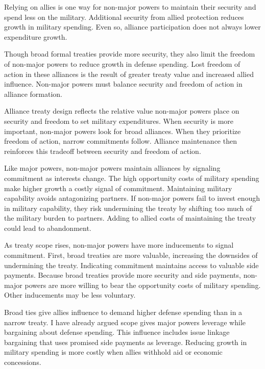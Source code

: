 \documentclass[12pt]{article}
\begin{document}
Relying on allies is one way for non-major powers to maintain their security and spend less on the military.  
Additional security from allied protection reduces growth in military spending. 
Even so, alliance participation does not always lower expenditure growth.


Though broad formal treaties provide more security, they also limit the freedom of non-major powers to reduce growth in defense spending.
Lost freedom of action in these alliances is the result of greater treaty value and increased allied influence. 
Non-major powers must balance security and freedom of action in alliance formation. 


Alliance treaty design reflects the relative value non-major powers place on security and freedom to set military expenditures. 
When security is more important, non-major powers look for broad alliances.
When they prioritize freedom of action, narrow commitments follow. 
Alliance maintenance then reinforces this tradeoff between security and freedom of action. 


Like major powers, non-major powers maintain alliances by signaling commitment as interests change. 
The high opportunity costs of military spending make higher growth a costly signal of commitment. 
Maintaining military capability avoids antagonizing partners. 
If non-major powers fail to invest enough in military capability, they risk undermining the treaty by shifting too much of the military burden to partners. 
Adding to allied costs of maintaining the treaty could lead to abandonment. 


As treaty scope rises, non-major powers have more inducements to signal commitment.
First, broad treaties are more valuable, increasing the downsides of undermining the treaty. 
Indicating commitment maintains access to valuable side payments.   
Because broad treaties provide more security and side payments, non-major powers are more willing to bear the opportunity costs of military spending. 
Other inducements may be less voluntary.   


Broad ties give allies influence to demand higher defense spending than in a narrow treaty. 
I have already argued scope gives major powers leverage while bargaining about defense spending. 
This influence includes issue linkage bargaining that uses promised side payments as leverage. 
Reducing growth in military spending is more costly when allies withhold aid or economic concessions. 
\end{document}
